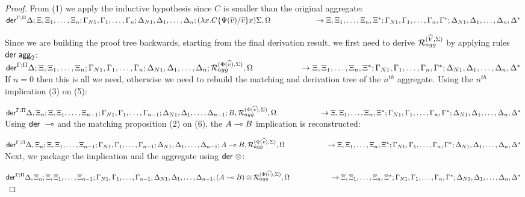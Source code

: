 \begin{proof}
\noindent From (1) we apply the inductive hypothesis since $C$ is smaller than
the original aggregate:\\
$\mathsf{der}^{\Gamma ; \Pi} \Delta ; \Xi, \Xi_1, \dotsc, \Xi_n; \Gamma_{N1}, \Gamma_1,
\dotsc, \Gamma_n; \Delta_{N1}, \Delta_1, \dotsc, \Delta_n; 
   (\lambda x.  C\{\Psi(\widehat{v})/\widehat{v}\} x) \Sigma,
   \Omega\\ \hspace*{2cm} \rightarrow \Xi, \Xi_1, \dotsc, \Xi_n, \Xi^{*}; \Gamma_{N1}, \Gamma_1, \dotsc, \Gamma_n, \Gamma^{*}; \Delta_{N1}, \Delta_1, \dotsc, \Delta_n, \Delta^{*}$

\noindent Since we are building the proof tree backwards, starting from the final
derivation result, we first need to derive $\mathcal{R}_{agg}^{(\widehat{V}, \Sigma)}$ by applying rules
$\mathsf{der} \; \mathsf{agg}_2$:\\
$\mathsf{der}^{\Gamma ; \Pi} \Delta ; \Xi, \Xi_1, \dotsc, \Xi_n; \Gamma_{N1}, \Gamma_1,
\dotsc, \Gamma_n; \Delta_{N1}, \Delta_1, \dotsc, \Delta_n; \mathcal{R}_{agg}^{(\Phi(\widehat{v}), \Sigma)}, \Omega \\ \hspace*{2cm} \rightarrow \Xi, \Xi_1, \dotsc, \Xi_n, \Xi^{*}; \Gamma_{N1}, \Gamma_1, \dotsc, \Gamma_n, \Gamma^{*}; \Delta_{N1}, \Delta_1, \dotsc, \Delta_n, \Delta^{*}$ \\

\noindent If $n = 0$ then this is all we need, otherwise
we need to rebuild the matching and derivation tree of the
$n^{th}$ aggregate.  Using the $n^{th}$ implication (3) on (5):

\noindent $\mathsf{der}^{\Gamma ; \Pi} \Delta, \Xi_n ; \Xi, \Xi_1, \dotsc, \Xi_{n-1}; \Gamma_{N1}, \Gamma_1,
\dotsc, \Gamma_{n-1}; \Delta_{N1}, \Delta_1, \dotsc, \Delta_{n-1}; B, \mathcal{R}_{agg}^{(\Phi(\widehat{v}), \Sigma)},
   \Omega \\ \hspace*{2cm} \rightarrow \Xi, \Xi_1, \dotsc, \Xi_n, \Xi^{*}; \Gamma_{N1}, \Gamma_1, \dotsc, \Gamma_n, \Gamma^{*}; \Delta_{N1}, \Delta_1, \dotsc, \Delta_n, \Delta^{*}$ \\

\noindent Using $\mathsf{der} \; \multimap$ and the matching proposition (2) on (6), the $A \multimap B$
implication is reconstructed:

\noindent $\mathsf{der}^{\Gamma ; \Pi} \Delta, \Xi_n ; \Xi, \Xi_1, \dotsc, \Xi_{n-1}; \Gamma_{N1},
   \Gamma_1, \dotsc, \Gamma_{n-1}; \Delta_{N1}, \Delta_1, \dotsc, \Delta_{n-1}; A \multimap B, \mathcal{R}_{agg}^{(\Phi(\widehat{v}), \Sigma)}, \Omega \\ \hspace*{2cm} \rightarrow \Xi, \Xi_1, \dotsc, \Xi_n, \Xi^{*}; \Gamma_{N1}, \Gamma_1, \dotsc, \Gamma_n, \Gamma^{*}; \Delta_{N1}, \Delta_1, \dotsc, \Delta_n, \Delta^{*}$ \\

\noindent Next, we package the implication and the aggregate using $\mathsf{der} \; \otimes$:

\noindent $\mathsf{der}^{\Gamma ; \Pi} \Delta, \Xi_n ; \Xi, \Xi_1, \dotsc, \Xi_{n-1}; \Gamma_{N1},
\Gamma_1, \dotsc, \Gamma_{n-1}; \Delta_{N1}, \Delta_1, \dotsc, \Delta_{n-1}; 
(A \multimap B) \otimes \mathcal{R}_{agg}^{(\Phi(\widehat{v}), \Sigma)}, \Omega \\
\hspace*{2cm} \rightarrow \Xi, \Xi_1, \dotsc, \Xi_n, \Xi^{*}; \Gamma_{N1}, \Gamma_1, \dotsc, \Gamma_n, \Gamma^{*}; \Delta_{N1}, \Delta_1, \dotsc, \Delta_n, \Delta^{*}$ \\


\end{proof}
